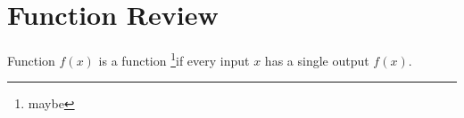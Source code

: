 \section{Function Review}

\begin{defn}{Function}
  $f(x)$ is a function \footnote{maybe}if every input $x$ has a single output $f(x)$.
\end{defn}
